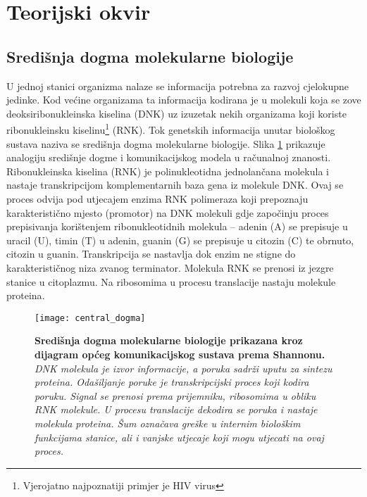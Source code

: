 \section{Teorijski okvir}
\label{ch:ch1}

\subsection{Središnja dogma molekularne biologije}

U jednoj stanici organizma nalaze se informacija potrebna za razvoj cjelokupne jedinke. Kod većine organizama ta informacija kodirana je u molekuli koja se zove deoksiribonukleinska kiselina  (DNK) uz izuzetak nekih organizama koji koriste ribonukleinsku kiselinu\footnote{Vjerojatno najpoznatiji primjer je HIV virus} (RNK). Tok genetskih informacija unutar biološkog sustava naziva se središnja dogma molekularne biologije. Slika \ref{fig:dogma} prikazuje analogiju središnje dogme i komunikacijskog modela u računalnoj znanosti. Ribonukleinska kiselina (RNK) je polinukleotidna jednolančana molekula i nastaje transkripcijom komplementarnih baza gena iz molekule DNK. Ovaj se proces odvija pod utjecajem enzima RNK polimeraza koji prepoznaju karakteristično mjesto (promotor) na DNK molekuli gdje započinju proces prepisivanja korištenjem ribonukleotidnih molekula – adenin (A) se prepisuje u uracil (U), timin (T) u adenin, guanin (G) se prepisuje u citozin (C) te obrnuto, citozin u guanin. Transkripcija se nastavlja dok enzim ne stigne do karakterističnog niza zvanog terminator. Molekula RNK se prenosi iz jezgre stanice u citoplazmu. Na ribosomima u procesu translacije nastaju molekule proteina\cite{Brown01}.
\par
\begin{center}
   \begin{figure}[ht!]
      \begin{center}
         \texttt{[image: central\_dogma]}
                 \caption[Središnja dogma molekularne biologije]{\textbf{Središnja dogma molekularne biologije prikazana kroz dijagram općeg komunikacijskog sustava prema Shannonu\cite{Shannon01}.} \textit{DNK molekula je izvor informacije, a poruka sadrži uputu za sintezu proteina. Odašiljanje poruke je transkripcijski proces koji kodira poruku. Signal se prenosi prema prijemniku, ribosomima u obliku RNK molekule. U procesu translacije dekodira se poruka i nastaje molekula proteina. Šum označava greške u internim biološkim funkcijama stanice, ali i vanjske utjecaje koji mogu utjecati na ovaj proces.}}
         \label{fig:dogma}
      \end{center}
   \end{figure}
\end{center}

